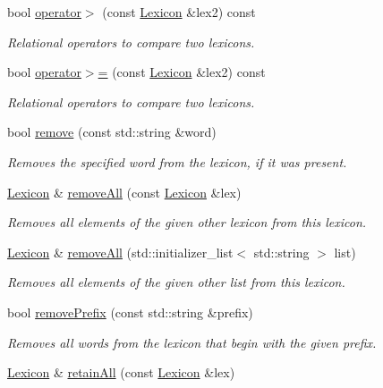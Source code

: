 \begin{DoxyCompactItemize}
bool \mbox{\hyperlink{classLexicon_a04139ff41f8d25adbf5958ff2b01b068}{operator$>$}} (const \mbox{\hyperlink{classLexicon}{Lexicon}} \&lex2) const
\begin{DoxyCompactList}\small\item\em Relational operators to compare two lexicons. \end{DoxyCompactList}\item 
bool \mbox{\hyperlink{classLexicon_a05b7f6593b8b859858cf21ffbc9e5ab1}{operator$>$=}} (const \mbox{\hyperlink{classLexicon}{Lexicon}} \&lex2) const
\begin{DoxyCompactList}\small\item\em Relational operators to compare two lexicons. \end{DoxyCompactList}\item 
bool \mbox{\hyperlink{classLexicon_affc6169b054fb3bbc4d72694e1a5834e}{remove}} (const std\+::string \&word)
\begin{DoxyCompactList}\small\item\em Removes the specified word from the lexicon, if it was present. \end{DoxyCompactList}\item 
\mbox{\hyperlink{classLexicon}{Lexicon}} \& \mbox{\hyperlink{classLexicon_a606a7338945745d8ac9ce21f456f08d9}{remove\+All}} (const \mbox{\hyperlink{classLexicon}{Lexicon}} \&lex)
\begin{DoxyCompactList}\small\item\em Removes all elements of the given other lexicon from this lexicon. \end{DoxyCompactList}\item 
\mbox{\hyperlink{classLexicon}{Lexicon}} \& \mbox{\hyperlink{classLexicon_a8ef0b8a849b2d33d83bc9689c4c4d090}{remove\+All}} (std\+::initializer\+\_\+list$<$ std\+::string $>$ list)
\begin{DoxyCompactList}\small\item\em Removes all elements of the given other list from this lexicon. \end{DoxyCompactList}\item 
bool \mbox{\hyperlink{classLexicon_a998af18a2f0af7d18ce689acee75ca59}{remove\+Prefix}} (const std\+::string \&prefix)
\begin{DoxyCompactList}\small\item\em Removes all words from the lexicon that begin with the given prefix. \end{DoxyCompactList}\item 
\mbox{\hyperlink{classLexicon}{Lexicon}} \& \mbox{\hyperlink{classLexicon_a38501eec95ff302cb83dae17ab478b81}{retain\+All}} (const \mbox{\hyperlink{classLexicon}{Lexicon}} \&lex)

\end{DoxyCompactItemize}
